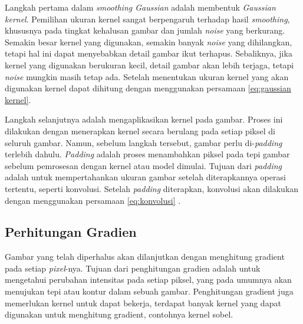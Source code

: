     Langkah pertama dalam \emph{smoothing Gaussian} adalah membentuk \emph{Gaussian kernel}. Pemilihan ukuran kernel sangat berpengaruh terhadap hasil \emph{smoothing}, khususnya pada tingkat kehalusan gambar dan jumlah \emph{noise} yang berkurang.
Semakin besar kernel yang digunakan, semakin banyak \emph{noise} yang dihilangkan, tetapi hal ini dapat menyebabkan detail gambar ikut terhapus. Sebaliknya, jika kernel yang digunakan berukuran kecil, detail gambar akan lebih terjaga, tetapi \emph{noise} mungkin masih tetap ada.
Setelah menentukan ukuran kernel yang akan digunakan kernel dapat dihitung dengan menggunakan persamaan \eqref{eq:gaussian kernel}.

    Langkah selanjutnya adalah mengaplikasikan kernel pada gambar. Proses ini dilakukan dengan menerapkan kernel secara berulang pada setiap piksel di seluruh gambar.
Namun, sebelum langkah tersebut, gambar perlu di-\emph{padding} terlebih dahulu. \emph{Padding} adalah proses menambahkan piksel pada tepi gambar sebelum pemrosesan dengan kernel atau model dimulai.
Tujuan dari \emph{padding} adalah untuk mempertahankan ukuran gambar setelah diterapkannya operasi tertentu, seperti konvolusi. 
Setelah \emph{padding} diterapkan, konvolusi akan dilakukan dengan menggunakan persamaan \eqref{eq:konvolusi} . 

\subsection{Perhitungan Gradien}
    Gambar yang telah diperhalus akan dilanjutkan dengan menghitung gradient pada setiap \emph{pixel}-nya. Tujuan dari penghitungan gradien adalah untuk mengetahui perubahan intensitas pada setiap piksel, yang pada umumnya akan menujukan tepi atau kontur dalam sebuah gambar.
Penghitungan gradient juga memerlukan kernel untuk dapat bekerja, terdapat banyak kernel yang dapat digunakan untuk menghitung gradient, contohnya kernel sobel. 

